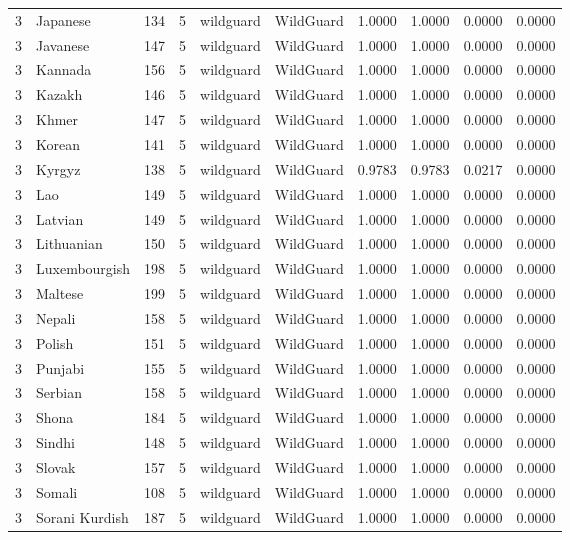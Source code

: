 \begin{tabular}{rlrrllrrrr}
3 & Japanese & 134 & 5 & wildguard & WildGuard & 1.0000 & 1.0000 & 0.0000 & 0.0000 \\
3 & Javanese & 147 & 5 & wildguard & WildGuard & 1.0000 & 1.0000 & 0.0000 & 0.0000 \\
3 & Kannada & 156 & 5 & wildguard & WildGuard & 1.0000 & 1.0000 & 0.0000 & 0.0000 \\
3 & Kazakh & 146 & 5 & wildguard & WildGuard & 1.0000 & 1.0000 & 0.0000 & 0.0000 \\
3 & Khmer & 147 & 5 & wildguard & WildGuard & 1.0000 & 1.0000 & 0.0000 & 0.0000 \\
3 & Korean & 141 & 5 & wildguard & WildGuard & 1.0000 & 1.0000 & 0.0000 & 0.0000 \\
3 & Kyrgyz & 138 & 5 & wildguard & WildGuard & 0.9783 & 0.9783 & 0.0217 & 0.0000 \\
3 & Lao & 149 & 5 & wildguard & WildGuard & 1.0000 & 1.0000 & 0.0000 & 0.0000 \\
3 & Latvian & 149 & 5 & wildguard & WildGuard & 1.0000 & 1.0000 & 0.0000 & 0.0000 \\
3 & Lithuanian & 150 & 5 & wildguard & WildGuard & 1.0000 & 1.0000 & 0.0000 & 0.0000 \\
3 & Luxembourgish & 198 & 5 & wildguard & WildGuard & 1.0000 & 1.0000 & 0.0000 & 0.0000 \\
3 & Maltese & 199 & 5 & wildguard & WildGuard & 1.0000 & 1.0000 & 0.0000 & 0.0000 \\
3 & Nepali & 158 & 5 & wildguard & WildGuard & 1.0000 & 1.0000 & 0.0000 & 0.0000 \\
3 & Polish & 151 & 5 & wildguard & WildGuard & 1.0000 & 1.0000 & 0.0000 & 0.0000 \\
3 & Punjabi & 155 & 5 & wildguard & WildGuard & 1.0000 & 1.0000 & 0.0000 & 0.0000 \\
3 & Serbian & 158 & 5 & wildguard & WildGuard & 1.0000 & 1.0000 & 0.0000 & 0.0000 \\
3 & Shona & 184 & 5 & wildguard & WildGuard & 1.0000 & 1.0000 & 0.0000 & 0.0000 \\
3 & Sindhi & 148 & 5 & wildguard & WildGuard & 1.0000 & 1.0000 & 0.0000 & 0.0000 \\
3 & Slovak & 157 & 5 & wildguard & WildGuard & 1.0000 & 1.0000 & 0.0000 & 0.0000 \\
3 & Somali & 108 & 5 & wildguard & WildGuard & 1.0000 & 1.0000 & 0.0000 & 0.0000 \\
3 & Sorani Kurdish & 187 & 5 & wildguard & WildGuard & 1.0000 & 1.0000 & 0.0000 & 0.0000 \\

\end{tabular}
